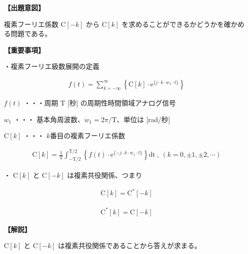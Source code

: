 \noindent \textbf{【出題意図】}

\bigskip
\noindent 複素フーリエ係数 $\textrm{C}[-k]$ から $\textrm{C}[k]$ を求めることができるかどうかを確かめる問題である。

\vspace{1em}
\noindent \textbf{【重要事項】}

\medskip
\noindent ・複素フーリエ級数展開の定義

\begin{align*}
f(t) = \sum_{k = -\infty}^{\infty} 
\left \{
\textrm{C}[k] \cdot \textrm{e}^{\{j \cdot k \cdot w_1 \cdot t \}}
\right \}
\end{align*}

\medskip
\noindent $f(t)$ ・・・周期 $\textrm{T}$ [秒] の周期性時間領域アナログ信号

\medskip
\noindent $w_1$ ・・・ 基本角周波数、$w_1 = 2\pi/\textrm{T}$、単位は [rad/秒]

\medskip
\noindent $\textrm{C}[k]$ ・・・ $k$番目の複素フーリエ係数

\begin{align*}
\textrm{C}[k] = \frac{1}{\textrm{T}} \int_{-\textrm{T}/2}^{\textrm{T}/2} 
\left \{
f(t) \cdot \textrm{e}^{\{-j \cdot k \cdot w_1 \cdot t \}} 
\right \}
\textrm{dt}
\ ,\  (k = 0, \pm 1, \pm 2, \cdots)
\end{align*}

\bigskip
\noindent ・ $\textrm{C}[k]$ と $\textrm{C}[-k]$ は複素共役関係、つまり

\begin{align*}
\textrm{C}[k] = \textrm{C}^{*}[-k]
\end{align*}

\begin{align*}
\textrm{C}^{*}[k] = \textrm{C}[-k]
\end{align*}

\bigskip

\vspace{1em}
\noindent \textbf{【解説】}

\bigskip
\noindent $\textrm{C}[k]$ と $\textrm{C}[-k]$ は複素共役関係であることから答えが求まる。

